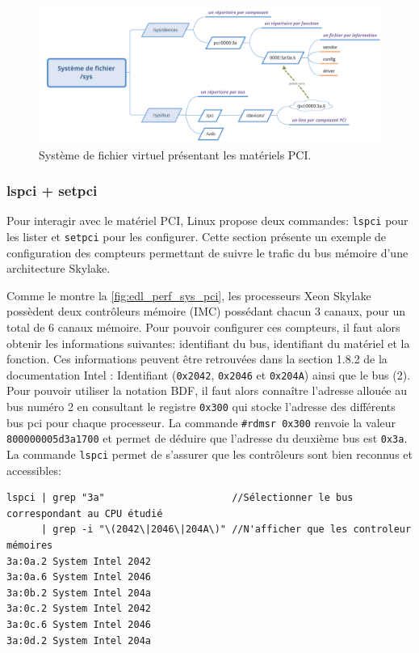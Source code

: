     
        \begin{figure}
        \center
        \includegraphics[width=14cm]{images/edl_perf_sys_pci.png}
        \caption{\label{fig:edl_perf_sys_pci} Système de fichier virtuel présentant les matériels PCI.}
        \end{figure}

    
    \subsubsection{lspci + setpci}\label{annexe:hc_lspci}
    
        Pour interagir avec le matériel PCI, Linux propose deux commandes: \verb|lspci| pour les lister et \verb|setpci| pour les configurer. Cette section présente un exemple de configuration des compteurs permettant de suivre le trafic du bus mémoire d'une architecture Skylake. 
        
        
        
        Comme le montre la \autoref{fig:edl_perf_sys_pci}, les processeurs Xeon Skylake possèdent deux contrôleurs mémoire (IMC) possédant chacun 3 canaux, pour un total de 6 canaux mémoire. Pour pouvoir configurer ces compteurs, il faut alors obtenir les informations suivantes: identifiant du bus, identifiant du matériel et la fonction. Ces informations peuvent être retrouvées dans la section 1.8.2 de la documentation Intel \cite{Intel2017b}: Identifiant (\verb|0x2042|, \verb|0x2046| et \verb|0x204A|) ainsi que le bus  (2). Pour pouvoir utiliser la notation BDF, il faut alors connaître l'adresse allouée au bus numéro 2 en consultant le registre \verb|0x300| qui stocke l'adresse des différents bus pci pour chaque processeur. La commande \verb|#rdmsr 0x300| renvoie la valeur \verb|800000005d3a1700| et permet de déduire que l'adresse du deuxième bus est \verb|0x3a|. La commande \verb|lspci| permet de s'assurer que les contrôleurs sont bien reconnus et accessibles:
\begin{verbatim}
lspci | grep "3a"                      //Sélectionner le bus correspondant au CPU étudié
      | grep -i "\(2042\|2046\|204A\)" //N'afficher que les controleur mémoires
3a:0a.2 System Intel 2042 
3a:0a.6 System Intel 2046 
3a:0b.2 System Intel 204a 
3a:0c.2 System Intel 2042
3a:0c.6 System Intel 2046 
3a:0d.2 System Intel 204a
\end{verbatim}
    
